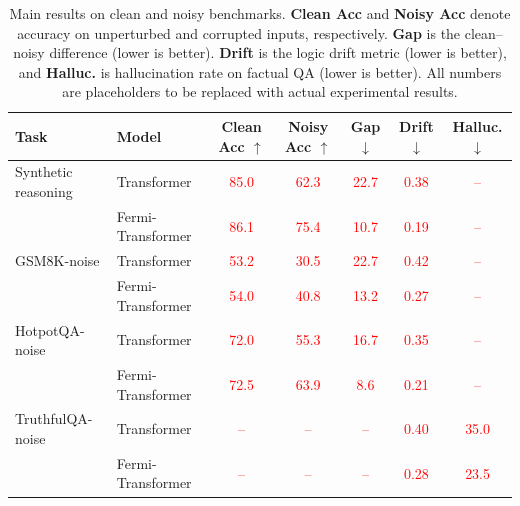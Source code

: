 \documentclass{article}
\newcommand{\TODO}[1]{\textcolor{red}{#1}}
\begin{document}
\begin{table}[t]
    \centering
    \small
    \caption{
    Main results on clean and noisy benchmarks.
    \textbf{Clean Acc} and \textbf{Noisy Acc} denote accuracy on unperturbed and corrupted inputs, respectively. \textbf{Gap} is the clean--noisy difference (lower is better). \textbf{Drift} is the logic drift metric (lower is better), and \textbf{Halluc.} is hallucination rate on factual QA (lower is better). All numbers are placeholders to be replaced with actual experimental results.
    }
    \label{tab:main_results}
    \begin{tabular}{l l c c c c c}
        \toprule
        Task & Model & Clean Acc $\uparrow$ & Noisy Acc $\uparrow$ & Gap $\downarrow$ & Drift $\downarrow$ & Halluc. $\downarrow$ \\
        \midrule
        Synthetic reasoning &
        Transformer &
        \TODO{85.0} &
        \TODO{62.3} &
        \TODO{22.7} &
        \TODO{0.38} &
        \TODO{--} \\

        & Fermi-Transformer &
        \TODO{86.1} &
        \TODO{75.4} &
        \TODO{10.7} &
        \TODO{0.19} &
        \TODO{--} \\
        \midrule
        GSM8K-noise &
        Transformer &
        \TODO{53.2} &
        \TODO{30.5} &
        \TODO{22.7} &
        \TODO{0.42} &
        \TODO{--} \\

        & Fermi-Transformer &
        \TODO{54.0} &
        \TODO{40.8} &
        \TODO{13.2} &
        \TODO{0.27} &
        \TODO{--} \\
        \midrule
        HotpotQA-noise &
        Transformer &
        \TODO{72.0} &
        \TODO{55.3} &
        \TODO{16.7} &
        \TODO{0.35} &
        \TODO{--} \\

        & Fermi-Transformer &
        \TODO{72.5} &
        \TODO{63.9} &
        \TODO{8.6} &
        \TODO{0.21} &
        \TODO{--} \\
        \midrule
        TruthfulQA-noise &
        Transformer &
        \TODO{--} &
        \TODO{--} &
        \TODO{--} &
        \TODO{0.40} &
        \TODO{35.0} \\

        & Fermi-Transformer &
        \TODO{--} &
        \TODO{--} &
        \TODO{--} &
        \TODO{0.28} &
        \TODO{23.5} \\
        \bottomrule
    \end{tabular}
\end{table}
\end{document}

